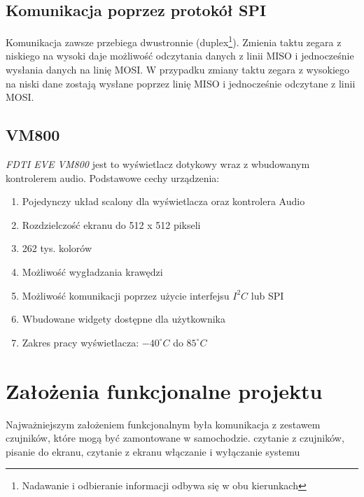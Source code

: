 \documentclass{xmgr}
\begin{document}
\subsection{Komunikacja poprzez protokół SPI}
Komunikacja zawsze przebiega dwustronnie (duplex\footnote{Nadawanie i odbieranie informacji odbywa się w obu kierunkach}). Zmienia taktu zegara z niskiego na wysoki daje możliwość odczytania danych z linii MISO i jednocześnie wysłania danych na linię MOSI. W przypadku zmiany taktu zegara z wysokiego na niski dane zostają wysłane poprzez linię MISO i jednocześnie odczytane z linii MOSI.

\subsection{VM800}
\emph{FDTI EVE VM800} jest to wyświetlacz dotykowy wraz z wbudowanym kontrolerem audio. Podstawowe cechy urządzenia:
\begin{enumerate}
	\item Pojedynczy układ scalony dla wyświetlacza oraz kontrolera Audio
	\item Rozdzielczość ekranu do 512 x 512 pikseli
	\item 262 tys. kolorów
	\item Możliwość wygładzania krawędzi
	\item Możliwość komunikacji poprzez użycie interfejsu $I^2C$ lub SPI
	\item Wbudowane widgety dostępne dla użytkownika
	\item Zakres pracy wyświetlacza: $-40^{\circ} C$ do $85^{\circ} C$ 
\end{enumerate}

\section{Założenia funkcjonalne projektu}
Najważniejszym założeniem funkcjonalnym była komunikacja z zestawem czujników, które mogą być zamontowane w samochodzie. czytanie z czujników, pisanie do ekranu, czytanie z ekranu
włączanie i wyłączanie systemu
\end{document}
